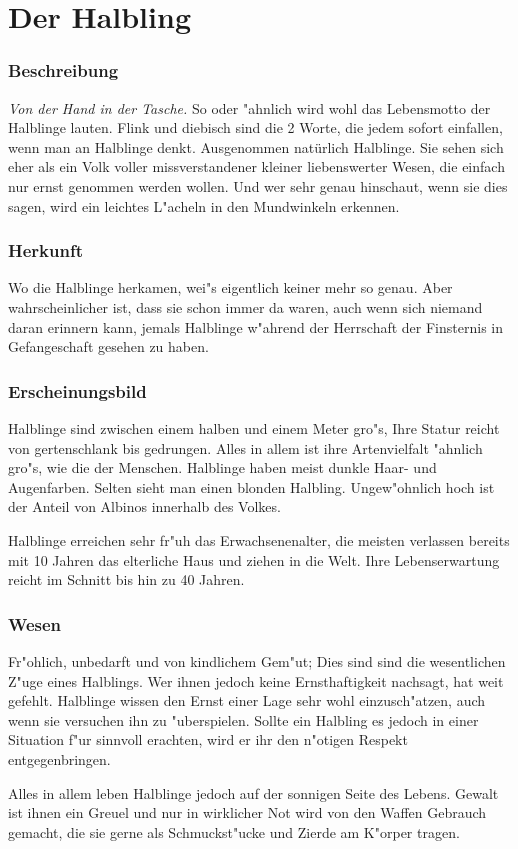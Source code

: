 \section{Der Halbling}
\subsubsection{Beschreibung}
\par \textit{\glqq Von der Hand in der Tasche.\grqq} So oder
"ahnlich wird wohl das Lebensmotto der Halblinge lauten. Flink und
diebisch sind die 2 Worte, die jedem sofort einfallen, wenn man an
Halblinge denkt. Ausgenommen natürlich Halblinge. Sie sehen sich
eher als ein Volk voller missverstandener kleiner liebenswerter
Wesen, die einfach nur ernst genommen werden wollen. Und wer sehr
genau hinschaut, wenn sie dies sagen, wird ein leichtes L"acheln in
den Mundwinkeln erkennen.
\subsubsection{Herkunft}
\par Wo die Halblinge herkamen, wei"s eigentlich keiner mehr so
genau. Aber wahrscheinlicher ist, dass sie schon immer da waren,
auch wenn sich niemand daran erinnern kann, jemals Halblinge
w"ahrend der Herrschaft der Finsternis in Gefangeschaft gesehen zu haben.
\subsubsection{Erscheinungsbild}
\par Halblinge sind zwischen einem halben und einem Meter gro"s,
Ihre Statur reicht von gertenschlank bis gedrungen. Alles in allem
ist ihre Artenvielfalt "ahnlich gro"s, wie die der Menschen.
Halblinge haben meist dunkle Haar- und Augenfarben. Selten sieht man
einen blonden Halbling. Ungew"ohnlich hoch ist der Anteil von
Albinos innerhalb des Volkes.
\par Halblinge erreichen sehr fr"uh das Erwachsenenalter, die meisten
verlassen bereits mit 10 Jahren das elterliche Haus und ziehen in
die Welt. Ihre Lebenserwartung reicht im Schnitt bis hin zu 40
Jahren.
\subsubsection{Wesen}
\par Fr"ohlich, unbedarft und von kindlichem Gem"ut; Dies sind
sind die wesentlichen Z"uge eines Halblings. Wer ihnen jedoch keine
Ernsthaftigkeit nachsagt, hat weit gefehlt. Halblinge wissen den
Ernst einer Lage sehr wohl einzusch"atzen, auch wenn sie versuchen
ihn zu "uberspielen. Sollte ein Halbling es jedoch in einer
Situation f"ur sinnvoll erachten, wird er ihr den n"otigen Respekt
entgegenbringen.
\par Alles in allem leben Halblinge jedoch auf der sonnigen Seite
des Lebens. Gewalt ist ihnen ein Greuel und nur in wirklicher Not
wird von den Waffen Gebrauch gemacht, die sie gerne als
Schmuckst"ucke und Zierde am K"orper tragen.
